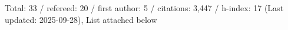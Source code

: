 Total: 33 / refereed: 20 / first author: 5 / citations: 3,447 / h-index: 17 (Last updated: 2025-09-28), List attached below
